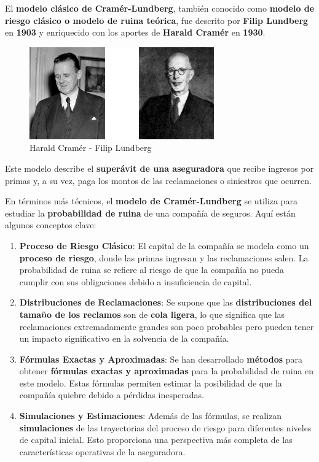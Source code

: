 \documentclass[
  us-letterpaper,
]{scrreprt}
\theoremstyle{plain}
\theoremstyle{plain}
\theoremstyle{definition}
\theoremstyle{remark}
\begin{document}
El \textbf{modelo clásico de Cramér-Lundberg}, también conocido como
\textbf{modelo de riesgo clásico o modelo de ruina teórica}, fue
descrito por \textbf{Filip Lundberg} en \textbf{1903} y enriquecido con
los aportes de \textbf{Harald Cramér} en \textbf{1930}.

\begin{figure}[H]

{\centering \includegraphics[width=3.125in,height=\textheight,keepaspectratio]{Diseño sin título.png}

}

\caption{Harald Cramér - Filip Lundberg}

\end{figure}%

Este modelo describe el \textbf{superávit de una aseguradora} que recibe
ingresos por primas y, a su vez, paga los montos de las reclamaciones o
siniestros que ocurren.

En términos más técnicos, el \textbf{modelo de Cramér-Lundberg} se
utiliza para estudiar la \textbf{probabilidad de ruina} de una compañía
de seguros. Aquí están algunos conceptos clave:

\begin{enumerate}
\def\labelenumi{\arabic{enumi}.}
\item
  \textbf{Proceso de Riesgo Clásico}: El capital de la compañía se
  modela como un \textbf{proceso de riesgo}, donde las primas ingresan y
  las reclamaciones salen. La probabilidad de ruina se refiere al riesgo
  de que la compañía no pueda cumplir con sus obligaciones debido a
  insuficiencia de capital.
\item
  \textbf{Distribuciones de Reclamaciones}: Se supone que las
  \textbf{distribuciones del tamaño de los reclamos} son de \textbf{cola
  ligera}, lo que significa que las reclamaciones extremadamente grandes
  son poco probables pero pueden tener un impacto significativo en la
  solvencia de la compañía.
\item
  \textbf{Fórmulas Exactas y Aproximadas}: Se han desarrollado
  \textbf{métodos} para obtener \textbf{fórmulas exactas y aproximadas}
  para la probabilidad de ruina en este modelo. Estas fórmulas permiten
  estimar la posibilidad de que la compañía quiebre debido a pérdidas
  inesperadas.
\item
  \textbf{Simulaciones y Estimaciones}: Además de las fórmulas, se
  realizan \textbf{simulaciones} de las trayectorias del proceso de
  riesgo para diferentes niveles de capital inicial. Esto proporciona
  una perspectiva más completa de las características operativas de la
  aseguradora.
\end{enumerate}
\end{document}
